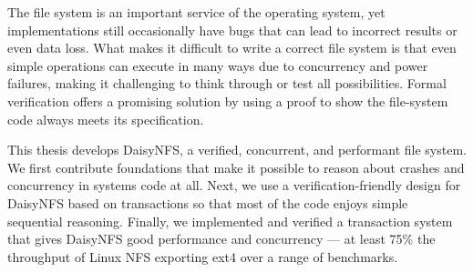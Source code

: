 The file system is an important service of the operating system, yet
implementations still occasionally have bugs that can lead to incorrect results
or even data loss. What makes it difficult to write a correct file system is
that even simple operations can execute in many ways due to concurrency and
power failures, making it challenging to think through or test all
possibilities. Formal verification offers a promising solution by using a proof
to show the file-system code always meets its specification.

This thesis develops DaisyNFS, a verified, concurrent, and performant file
system. We first contribute foundations that make it possible to reason about
crashes and concurrency in systems code at all. Next, we use a
verification-friendly design for DaisyNFS based on transactions so that most of
the code enjoys simple sequential reasoning. Finally, we implemented and
verified a transaction system that gives DaisyNFS good performance and
concurrency --- at least 75\% the throughput of Linux NFS exporting ext4 over a
range of benchmarks.
